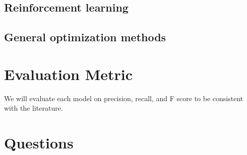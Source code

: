\documentclass{article}
\begin{document}
\subsection{Reinforcement learning}


\subsection{General optimization methods}
  

\section{Evaluation Metric}
	We will evaluate each model on precision, recall, and F score to be consistent with the literature.
 
 
\section{Questions}



\medskip




\small
\end{document}
